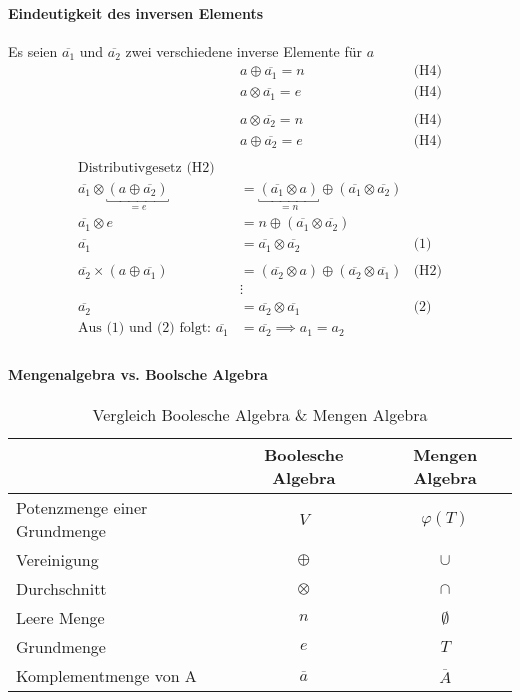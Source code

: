 \documentclass[a4paper]{scrartcl}
\begin{document}
				\paragraph{Eindeutigkeit des inversen Elements}
				Es seien \( \overline{a_1}\) und \( \overline{a_2}\) zwei verschiedene inverse Elemente für \(a\)
				\begin{align*}
					& a \oplus \overline{a_1} = n  & \text{(H4)}\\
					& a \otimes \overline{a_1} = e & \text{(H4)}\\
					\\
					&a \otimes \overline{a_2} = n& \text{(H4)}\\
					&a \oplus \overline{a_2} = e & \text{(H4)} \\
					\\
					\text{Distributivgesetz (H2)}\\
					\overline{a_1} \otimes \underbracket{( a \oplus \overline{a_2} )}_{= e} &= \underbracket{(\overline{a_1} \otimes a)}_{ = n} \oplus (\overline{a_1} \otimes \overline{a_2})\\
					 \overline{a_1} \otimes e &= n \oplus (\overline{a_1} \otimes \overline{a_2})\\
					\overline{a_1} &= \overline{a_1} \otimes \overline{a_2} & \text{(1)}\\
					\\
					\overline{a_2} \times ( a \oplus \overline{a_1}) &= (\overline{a_2} \otimes a) \oplus (\overline{a_2} \otimes \overline{a_1}) & \text{(H2)}\\
					&\vdots\\
					 \overline{a_2} &= \overline{a_2} \otimes \overline{a_1} & \text{(2)}\\
					\text{Aus (1) und (2) folgt: }  \overline{a_1} &= \overline{a_2} \implies a_1 = a_2\\
				\end{align*}
				
			 \paragraph{Mengenalgebra vs. Boolsche Algebra}
				 \begin{table}[H]
				 	\centering
				 	\begin{tabular}{|l|c|c|}
				 		\hline
				 		&Boolesche Algebra& Mengen Algebra\\ \hline
				 		Potenzmenge einer Grundmenge& \( V \) & \( \varphi (T) \)\\
				 		Vereinigung& \( \oplus \) &\( \cup \)\\
				 		Durchschnitt&\( \otimes \) & \( \cap \) \\
				 		Leere Menge& \( n \) & \( \emptyset \) \\
				 		Grundmenge& \( e \) & \( T \)\\
				 		Komplementmenge von A & \( \overline{a} \)  & \( \overline{A} \) \\ \hline
				 	\end{tabular}
			 	\caption{Vergleich Boolesche Algebra \& Mengen Algebra}
				 \end{table}
				 
\end{document}
